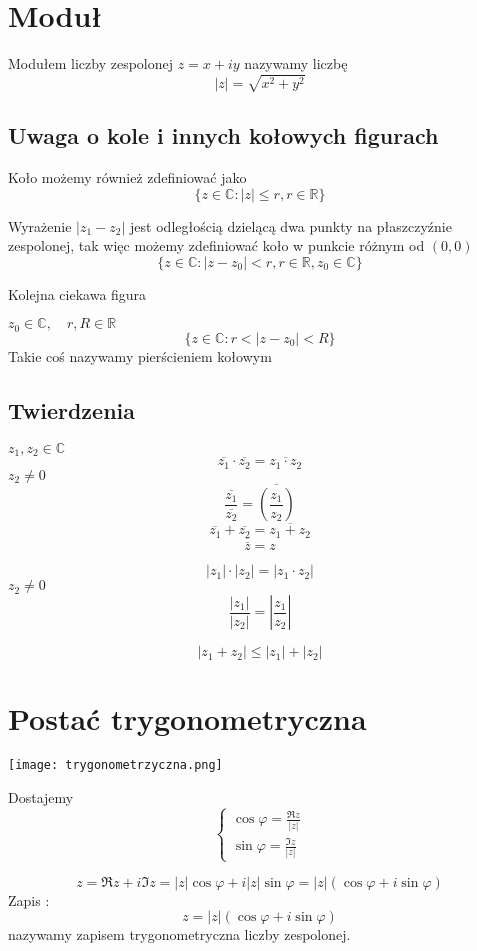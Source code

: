 \documentclass[11pt]{article}
\begin{document}
\section{Moduł}
Modułem liczby zespolonej $z = x + iy $ nazywamy liczbę
$$ |z| = \sqrt{x^2 + y^2} $$

\subsection{Uwaga o kole i innych kołowych figurach}
Koło możemy również zdefiniować jako
$$ \{ z \in \mathbb{C} : |z| \leq r , r \in \mathbb{R} \}$$

Wyrażenie $ |z_1 - z_2| $ jest odległością dzielącą dwa punkty na płaszczyźnie zespolonej, tak więc możemy zdefiniować koło w punkcie różnym od $(0,0)$
$$ \{ z \in \mathbb{C} : | z - z_0| < r , r \in \mathbb{R}, z_0 \in \mathbb{C}\}$$

Kolejna ciekawa figura

$z_0 \in \mathbb{C}, \quad r,R \in \mathbb{R}$ 
$$\{ z \in \mathbb{C} : r < | z - z_0 | < R \}$$
Takie coś nazywamy pierścieniem kołowym

\subsection{Twierdzenia}
$z_1, z_2 \in \mathbb{C}$
$$\overline{z_1} \cdot \overline{z_2}  = \overline{z_1\cdot z_2}$$
$z_2 \not = 0$
$$ \frac{\overline{z_1}}{\overline{z_2}} = \overline{\left(\frac{z_1}{z_2}\right)}$$
$$ \overline{z_1} + \overline{z_2} = \overline{z_1 + z_2}$$
$$ \overline{\overline{z}} = z$$

$$ |z_1| \cdot |z_2| = |z_1 \cdot z_2| $$
$z_2 \not = 0$
$$ \frac{|z_1|}{|z_2|} = \left|\frac{z_1}{z_2}\right|$$

$$ |z_1 + z_2| \leq |z_1| + |z_2|$$

\newpage
\section{Postać trygonometryczna}
\begin{center}
\texttt{[image: trygonometrzyczna.png]}
\end{center}

Dostajemy
$$\begin{cases}
\cos{\varphi} = \frac{\Re{z}}{|z|} \\
\sin{\varphi} = \frac{\Im{z}}{|z|} 
\end{cases}$$

$$ z = \Re{z} + i \Im{z} = |z|\cos{\varphi} + i|z|\sin{\varphi} = |z|(\cos{\varphi} + i \sin{\varphi})$$
Zapis :
$$ z = |z|(\cos{\varphi} + i \sin{\varphi})$$
nazywamy zapisem trygonometryczna liczby zespolonej.
\end{document}
